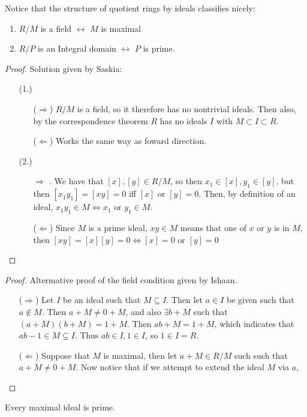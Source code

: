 \documentclass[12pt, twosided]{article}
\begin{document}
Notice that the structure of quotient rings by ideals classifies nicely:

\begin{thm}\label{Ex2} \hspace{0ex}
  \begin{enumerate}
  \item \(R/M\) is a field \(\longleftrightarrow\) \(M\) is maximal
  \item \(R/P\) is an Integral domain \(\longleftrightarrow\) \(P\) is prime.
  \end{enumerate}
\end{thm}
\begin{proof} Solution given by Saskia:
  \begin{enumerate}
  \item [(1.)]\hspace{0ex}
    \begin{enumerate}
    \item [(\(\Rightarrow\))] \(R/M\) is a field, so it therefore has no nontrivial ideals. Then also, by the correspondence theorem \(R\) has no ideals \(I\) with \(M \subset I \subset R\).
    \item [(\(\Leftarrow\))] Works the same way as foward direction.\partdone
    \end{enumerate}
  \item [(2.)]\hspace{0ex}
    \begin{enumerate}
    \item [\(\Rightarrow\)]. We have that \([x],[y] \in R/M\), so then \(x_1 \in [x], y_1 \in [y]\), but then \([x_1y_1] = [xy] = 0\) iff \([x]\) or \([y] = 0\). Then, by definition of an ideal, \(x_1y_1 \in M \Leftrightarrow x_1\) or \(y_1 \in M\).
    \item [(\(\Leftarrow\))] Since \(M\) is a prime ideal, \(xy \in M\) means that one of \(x\) or \(y\) is in \(M\), then \([xy] = [x][y] = 0 \Leftrightarrow [x]=0\) or \([y] = 0\)
    \end{enumerate}
  \end{enumerate}
\end{proof}

\begin{proof}
  Altermative proof of the field condition given by Ishaan.

  \begin{enumerate}
  \item [(\(\Rightarrow\))] Let \(I\) be an ideal such that \(M \subseteq I\). Then let \(a \in I\) be given such that \(a \not\in M\). Then \(a + M \neq 0 + M\), and also \(\exists b + M\) such that \((a + M)(b + M) = 1 + M\). Then \(ab + M  = 1+M\), which indicates that \(ab - 1 \in M \subsetneq I\). Thus \(ab \in I, 1 \in I\), so \(1 \in I = R\).
  \item [(\(\Leftarrow\))] Suppose that \(M\) is maximal, then let \(a + M \in R/M\) such such that \(a + M \neq 0 + M\). Now notice that if we attempt to extend the ideal \(M\) via \(a\), 
  \end{enumerate}
\end{proof}
\begin{note}
  Every maximal ideal is prime.
\end{note}
\end{document}
